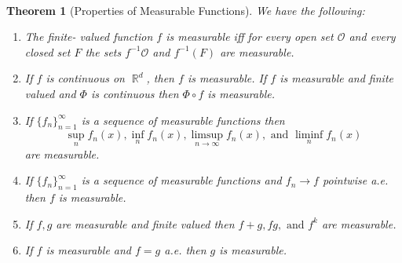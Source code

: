 \documentclass{article}
\DeclareMathOperator{\R}{\mathbb{R}}
\newtheorem*{thm}{\\ Theorem}
\begin{document}
\begin{thm}[Properties of Measurable Functions]
  We have the following:
  \begin{enumerate}
  \item[P1.] The finite- valued function $f$ is measurable iff for
    every open set $\mathcal{O}$ and every closed set $F$ the sets $f^{-1}
    \mathcal{O}$ and $f^{-1}(F)$ are measurable.
  \item[P2.] If $f$ is continuous on $\R^d$, then $f$ is measurable.
    If $f$ is measurable and finite valued and $\Phi$ is continuous then
    $\Phi \circ f$ is measurable.
  \item[P3.] If $\{f_n\}_{n=1}^\infty$ is a sequence of measurable
    functions then
    \[
    \sup_n f_n(x), \inf_n f_n(x), \limsup_{n\to\infty}f_n(x), \text{ and }
    \liminf_n f_n(x)
    \]
    are measurable.
  \item[P4.] If $\{f_n\}_{n=1}^\infty$ is a sequence of measurable
    functions and $f_n \to f$ pointwise a.e. then $f$ is measurable.
  \item[P5.] If $f,g$ are measurable and finite valued then $f+g, fg,
    \text{ and } f^k$ are measurable.
  \item[P6.] If $f$ is measurable and $f = g$ a.e. then $g$ is
    measurable.
  \end{enumerate}
\end{thm}
\end{document}
